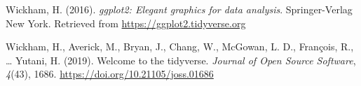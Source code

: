 \documentclass[
  man,floatsintext]{apa7}
\newlength{\cslhangindent}
\newlength{\cslentryspacingunit} %
\newenvironment{CSLReferences}[2] %
 {%
  \setlength{\parindent}{0pt}
  \ifodd #1
  \let\oldpar\par
  \def\par{\hangindent=\cslhangindent\oldpar}
  \fi
  \setlength{\parskip}{#2\cslentryspacingunit}
 }%
 {}
\begin{document}
\begin{CSLReferences}{1}{0}
\leavevmode{}%
Wickham, H. (2016). \emph{ggplot2: Elegant graphics for data analysis}. Springer-Verlag New York. Retrieved from \url{https://ggplot2.tidyverse.org}

\leavevmode{}%
Wickham, H., Averick, M., Bryan, J., Chang, W., McGowan, L. D., François, R., \ldots{} Yutani, H. (2019). Welcome to the {tidyverse}. \emph{Journal of Open Source Software}, \emph{4}(43), 1686. \url{https://doi.org/10.21105/joss.01686}

\end{CSLReferences}


\clearpage
\renewcommand{\listfigurename}{Figure captions}

\clearpage
\renewcommand{\listtablename}{Table captions}
\end{document}
